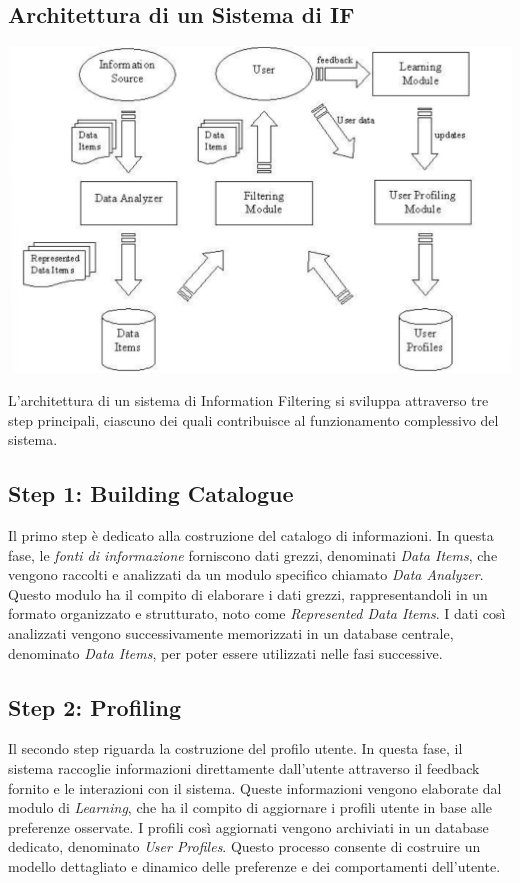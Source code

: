 \documentclass{report}
\begin{document}
	\subsection{Architettura di un Sistema di IF}
	\begin{center}
		\includegraphics[scale=0.4]{assets/if-arch.png}
	\end{center}
	L'architettura di un sistema di Information Filtering si sviluppa attraverso tre step principali, ciascuno dei quali contribuisce al funzionamento complessivo del sistema.

	\subsection*{Step 1: Building Catalogue}
	Il primo step è dedicato alla costruzione del catalogo di informazioni. In questa fase, le \emph{fonti di informazione} forniscono dati grezzi, denominati \emph{Data Items}, che vengono raccolti e analizzati da un modulo specifico chiamato \emph{Data Analyzer}. Questo modulo ha il compito di elaborare i dati grezzi, rappresentandoli in un formato organizzato e strutturato, noto come \emph{Represented Data Items}. I dati così analizzati vengono successivamente memorizzati in un database centrale, denominato \emph{Data Items}, per poter essere utilizzati nelle fasi successive.
	
	\subsection*{Step 2: Profiling}
	Il secondo step riguarda la costruzione del profilo utente. In questa fase, il sistema raccoglie informazioni direttamente dall'utente attraverso il feedback fornito e le interazioni con il sistema. Queste informazioni vengono elaborate dal modulo di \emph{Learning}, che ha il compito di aggiornare i profili utente in base alle preferenze osservate. I profili così aggiornati vengono archiviati in un database dedicato, denominato \emph{User Profiles}. Questo processo consente di costruire un modello dettagliato e dinamico delle preferenze e dei comportamenti dell'utente.
	
\end{document}
